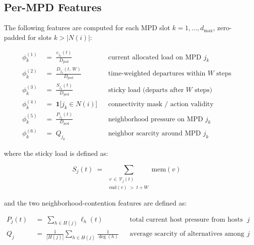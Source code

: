 \documentclass[11pt]{article}
\begin{document}
\subsection{Per-MPD Features}

The following features are computed for each MPD slot
$k = 1, \ldots, d_\mathrm{max}$, zero-padded for slots
$k > |N(i)|$:

\begin{align}
    \phi_k^{(1)} &\;=\;
        \frac{c_{j_k}(t)}{D_\mathrm{pod}}
        && \text{current allocated load on MPD } j_k
        \label{eq:phi1} \\[6pt]
    \phi_k^{(2)} &\;=\;
        \frac{D_{j_k}(t,\,W)}{D_\mathrm{pod}}
        && \text{time-weighted departures within } W \text{ steps}
        \label{eq:phi2} \\[6pt]
    \phi_k^{(3)} &\;=\;
        \frac{S_{j_k}(t)}{D_\mathrm{pod}}
        && \text{sticky load (departs after } W \text{ steps)}
        \label{eq:phi3} \\[6pt]
    \phi_k^{(4)} &\;=\;
        \mathbf{1}\bigl[j_k \in N(i)\bigr]
        && \text{connectivity mask / action validity}
        \label{eq:phi4} \\[6pt]
    \phi_k^{(5)} &\;=\;
        \frac{P_{j_k}(t)}{D_\mathrm{pod}}
        && \text{neighborhood pressure on MPD } j_k
        \label{eq:phi5} \\[6pt]
    \phi_k^{(6)} &\;=\;
        Q_{j_k}
        && \text{neighbor scarcity around MPD } j_k
        \label{eq:phi6}
\end{align}

where the sticky load is defined as:

\begin{equation}
    S_j(t)
    \;=\;
    \sum_{\substack{v \,\in\, \mathcal{V}_j(t) \\
                    \mathrm{end}(v) \;>\; t + W}}
    \mathrm{mem}(v)
    \label{eq:sticky}
\end{equation}

and the two neighborhood-contention features are defined as:

\begin{align}
    P_j(t)
    &\;=\;
    \sum_{h \in H(j)} \ell_h(t)
    && \text{total current host pressure from hosts attached to } j
    \label{eq:pressure} \\[6pt]
    Q_j
    &\;=\;
    \frac{1}{|H(j)|}
    \sum_{h \in H(j)}
    \frac{1}{\deg(h)}
    && \text{average scarcity of alternatives among hosts attached to } j
    \label{eq:scarcity}
\end{align}
\end{document}
